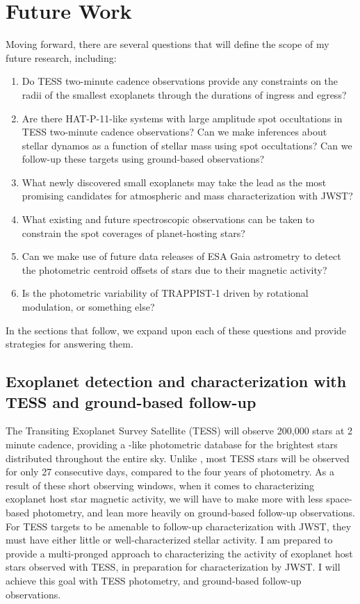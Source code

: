 \section{Future Work}

Moving forward, there are several questions that will define the scope of my future research, including: 
\begin{enumerate}
\item Do TESS two-minute cadence observations provide any constraints on the radii of the smallest exoplanets through the durations of ingress and egress?
\item Are there HAT-P-11-like systems with large amplitude spot occultations in TESS two-minute cadence observations? Can we make inferences about stellar dynamos as a function of stellar mass using spot occultations? Can we follow-up these targets using ground-based observations?
\item What newly discovered small exoplanets may take the lead as the most promising candidates for atmospheric and mass characterization with JWST? 
\item What existing and future spectroscopic observations can be taken to constrain the spot coverages of planet-hosting stars? 
\item Can we make use of future data releases of ESA Gaia astrometry to detect the photometric centroid offsets of stars due to their magnetic activity? 
\item Is the photometric variability of TRAPPIST-1 driven by rotational modulation, or something else? 
\end{enumerate}

In the sections that follow, we expand upon each of these questions and provide strategies for answering them.

\subsection{Exoplanet detection and characterization with TESS and ground-based follow-up}

The Transiting Exoplanet Survey Satellite (TESS) will observe 200,000 stars at 2 minute cadence, providing a \kepler-like photometric database for the brightest stars distributed throughout the entire sky. Unlike \kepler, most TESS stars will be observed for only 27 consecutive days, compared to the four years of \kepler photometry. As a result of these short observing windows, when it comes to characterizing exoplanet host star magnetic activity, we will have to make more with less space-based photometry, and lean more heavily on ground-based follow-up observations. For TESS targets to be amenable to follow-up characterization with JWST, they must have either little or well-characterized stellar activity. I am prepared to provide a multi-pronged approach to characterizing the activity of exoplanet host stars observed with TESS, in preparation for characterization by JWST. I will achieve this goal with TESS photometry, and ground-based follow-up observations.

